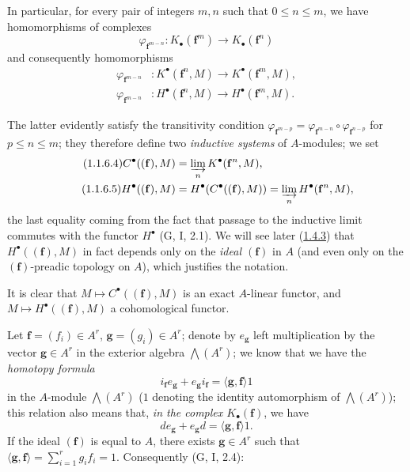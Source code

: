 \begin{env}[1.1.6]
\label{III.1.1.6}
In particular, for every pair of integers $m,n$ such that $0\leq n\leq m$,
we have homomorphisms of complexes
\begin{equation}
\label{III.1.1.6.1}
\tag{1.1.6.1}
\varphi_{\mathbf f^{m-n}}:K_\bullet(\mathbf f^m)\longrightarrow
K_\bullet(\mathbf f^n)
\end{equation}
and consequently homomorphisms
\begin{align}
\label{III.1.1.6.2}
\tag{1.1.6.2}
\varphi_{\mathbf f^{m-n}} &:K^\bullet(\mathbf f^n,M)\longrightarrow
K^\bullet(\mathbf f^m,M),\\
\label{III.1.1.6.3}
\tag{1.1.6.3}
\varphi_{\mathbf f^{m-n}} &:H^\bullet(\mathbf f^n,M)\longrightarrow
H^\bullet(\mathbf f^m,M).
\end{align}

The latter evidently satisfy the transitivity condition
$\varphi_{\mathbf f^{m-p}}=
\varphi_{\mathbf f^{m-n}}\circ\varphi_{\mathbf f^{n-p}}$ for $p\leq n\leq m$;
they therefore define two \emph{inductive systems} of $A$-modules; we set
\begin{align}
\label{III.1.1.6.4}
\tag{1.1.6.4}
C^\bullet((\mathbf f),M)&=\varinjlim_n K^\bullet(\mathbf f^n,M),\\
\label{III.1.1.6.5}
\tag{1.1.6.5}
H^\bullet((\mathbf f),M)&=H^\bullet(C^\bullet((\mathbf f),M))
=\varinjlim_n H^\bullet(\mathbf f^n,M),
\end{align}
the last equality coming from the fact that passage to the inductive limit
commutes with the functor $H^\bullet$ (G, I, 2.1). We will see later
(\hyperref[III.1.4.3]{1.4.3}) that $H^\bullet((\mathbf f),M)$ in fact
depends only on the \emph{ideal $(\mathbf f)$} in $A$ (and even only on the
$(\mathbf f)$-preadic topology on $A$), which justifies the notation.

It is clear that $M\mapsto C^\bullet((\mathbf f),M)$ is an exact
$A$-linear functor, and $M\mapsto H^\bullet((\mathbf f),M)$ a
cohomological functor.
\end{env}

\begin{env}[1.1.7]
\label{III.1.1.7}
Let $\mathbf f=(f_i)\in A^r$, $\mathbf g=(g_i)\in A^r$; denote by
$e_{\mathbf g}$ left multiplication by the vector
$\mathbf g\in A^r$ in the exterior algebra $\bigwedge(A^r)$; we know that
we have the \emph{homotopy formula}
\begin{equation}
\label{III.1.1.7.1}
\tag{1.1.7.1}
i_{\mathbf f}e_{\mathbf g}+e_{\mathbf g}i_{\mathbf f}
=\langle\mathbf g,\mathbf f\rangle 1
\end{equation}
in the $A$-module $\bigwedge(A^r)$ ($1$ denoting the identity automorphism
of $\bigwedge(A^r)$);
this relation also means that, \emph{in the complex
$K_\bullet(\mathbf f)$}, we have
\begin{equation}
\label{III.1.1.7.2}
\tag{1.1.7.2}
de_{\mathbf g}+e_{\mathbf g}d=\langle\mathbf g,\mathbf f\rangle 1.
\end{equation}
If the ideal $(\mathbf f)$ is equal to $A$, there exists $\mathbf g\in A^r$
such that $\langle\mathbf g,\mathbf f\rangle=\sum_{i=1}^r g_if_i=1$.
Consequently (G, I, 2.4):
\end{env}

